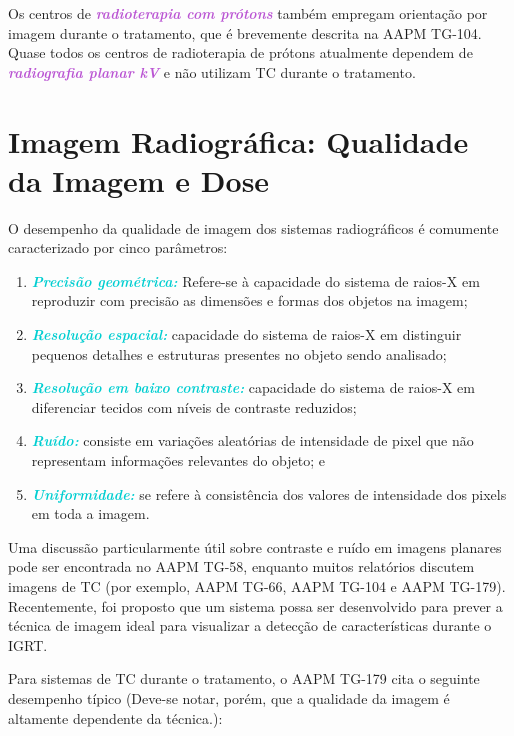 \documentclass[11pt,a4paper]{article}
\newcounter{exemplo}
\begin{document}
    Os centros de \textcolor{MediumOrchid}{\textbf{\textit{radioterapia com prótons}}} também empregam orientação por imagem durante o tratamento, que é brevemente descrita na AAPM TG-104. Quase todos os centros de radioterapia de prótons atualmente dependem de \textcolor{MediumOrchid}{\textbf{\textit{radiografia planar kV}}} e não utilizam TC durante o tratamento. 
    

\section{Imagem Radiográfica: Qualidade da Imagem e Dose}

    O desempenho da qualidade de imagem dos sistemas radiográficos é comumente caracterizado por cinco parâmetros:

    \begin{enumerate}
        \item \textcolor{DarkTurquoise}{\textbf{\textit{Precisão geométrica:}}} Refere-se à capacidade do sistema de raios-X em reproduzir com precisão as dimensões e formas dos objetos na imagem;
        \item \textcolor{DarkTurquoise}{\textbf{\textit{Resolução espacial:}}} capacidade do sistema de raios-X em distinguir pequenos detalhes e estruturas presentes no objeto sendo analisado;
        \item \textcolor{DarkTurquoise}{\textbf{\textit{Resolução em baixo contraste:}}} capacidade do sistema de raios-X em diferenciar tecidos com níveis de contraste reduzidos;
        \item \textcolor{DarkTurquoise}{\textbf{\textit{Ruído:}}} consiste em variações aleatórias de intensidade de pixel que não representam informações relevantes do objeto; e
        \item \textcolor{DarkTurquoise}{\textbf{\textit{Uniformidade:}}}  se refere à consistência dos valores de intensidade dos pixels em toda a imagem.
    \end{enumerate}

    Uma discussão particularmente útil sobre contraste e ruído em imagens planares pode ser encontrada no AAPM TG-58, enquanto muitos relatórios discutem imagens de TC (por exemplo, AAPM TG-66, AAPM TG-104 e AAPM TG-179). Recentemente, foi proposto que um sistema possa ser desenvolvido para prever a técnica de imagem ideal para visualizar a detecção de características durante o IGRT.

    Para sistemas de TC durante o tratamento, o AAPM TG-179 cita o seguinte desempenho típico (Deve-se notar, porém, que a qualidade da imagem é altamente dependente da técnica.):
\end{document}
